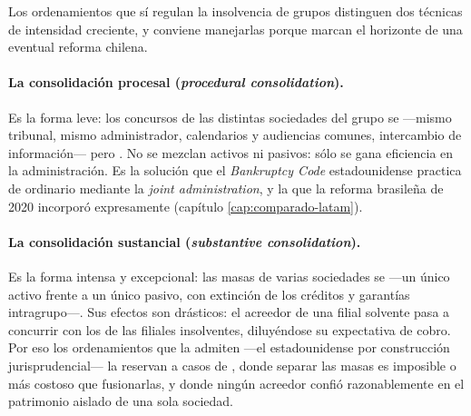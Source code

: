 Los ordenamientos que sí regulan la insolvencia de grupos distinguen dos técnicas de intensidad
creciente, y conviene manejarlas porque marcan el horizonte de una eventual reforma chilena.

\paragraph{La consolidación procesal (\emph{procedural consolidation}).} Es la forma leve: los
concursos de las distintas sociedades del grupo se  ---mismo
tribunal, mismo administrador, calendarios y audiencias comunes, intercambio de información--- pero
. No se mezclan activos ni pasivos: sólo se gana
eficiencia en la administración. Es la solución que el \emph{Bankruptcy Code} estadounidense
practica de ordinario mediante la \emph{joint administration}, y la que la reforma brasileña de 2020
incorporó expresamente (capítulo \ref{cap:comparado-latam}).

\paragraph{La consolidación sustancial (\emph{substantive consolidation}).} Es la forma intensa y
excepcional: las masas de varias sociedades se  ---un único activo
frente a un único pasivo, con extinción de los créditos y garantías intragrupo---. Sus efectos son
drásticos: el acreedor de una filial solvente pasa a concurrir con los de las filiales insolventes,
diluyéndose su expectativa de cobro. Por eso los ordenamientos que la admiten ---el estadounidense
por construcción jurisprudencial--- la reservan a casos de ,
donde separar las masas es imposible o más costoso que fusionarlas, y donde ningún acreedor confió
razonablemente en el patrimonio aislado de una sola sociedad.

